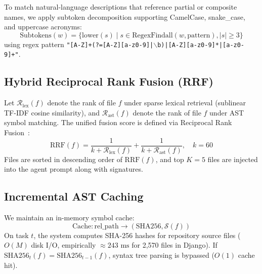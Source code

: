\documentclass[conference]{IEEEtran}
\begin{document}
To match natural-language descriptions that reference partial or composite names, we apply subtoken decomposition supporting CamelCase, snake\_case, and uppercase acronyms:
\begin{equation}
\text{Subtokens}(w) = \{ \text{lower}(s) \mid s \in \text{RegexFindall}(w, \text{pattern}), |s| \ge 3 \}
\end{equation}
using regex pattern \texttt{"[A-Z]+(?=[A-Z][a-z0-9]|$\backslash$b)|[A-Z][a-z0-9]*|[a-z0-9]+"}.

\subsection{Hybrid Reciprocal Rank Fusion (RRF)}
Let $\mathcal{R}_{\text{lex}}(f)$ denote the rank of file $f$ under sparse lexical retrieval (sublinear TF-IDF cosine similarity), and $\mathcal{R}_{\text{ast}}(f)$ denote the rank of file $f$ under AST symbol matching. The unified fusion score is defined via Reciprocal Rank Fusion~\cite{cormack2009rrf}:
\begin{equation}
\text{RRF}(f) = \frac{1}{k + \mathcal{R}_{\text{lex}}(f)} + \frac{1}{k + \mathcal{R}_{\text{ast}}(f)}, \quad k = 60
\end{equation}
Files are sorted in descending order of $\text{RRF}(f)$, and top $K=5$ files are injected into the agent prompt along with signatures.

\subsection{Incremental AST Caching}
We maintain an in-memory symbol cache:
\begin{equation}
\text{Cache}: \text{rel\_path} \to (\text{SHA256}, \mathcal{S}(f))
\end{equation}
On task $t$, the system computes SHA-256 hashes for repository source files ($O(M)$ disk I/O, empirically $\approx 243\text{ ms}$ for 2,570 files in Django). If $\text{SHA256}_t(f) = \text{SHA256}_{t-1}(f)$, syntax tree parsing is bypassed ($O(1)$ cache hit).
\end{document}
